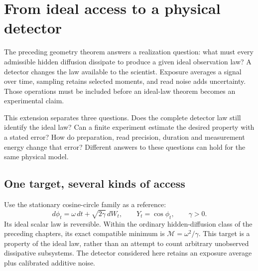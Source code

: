 \chapter{From ideal access to a physical detector}
\label{ch:dg-entry}

The preceding geometry theorem answers a realization question: what must
every admissible hidden diffusion dissipate to produce a given ideal
observation law? A detector changes the law available to the scientist.
Exposure averages a signal over time, sampling retains selected moments,
and read noise adds uncertainty. Those operations must be included before
an ideal-law theorem becomes an experimental claim.

This extension separates three questions. Does the complete detector law
still identify the ideal law? Can a finite experiment estimate the desired
property with a stated error? How do preparation, read precision, duration
and measurement energy change that error? Different answers to these
questions can hold for the same physical model.

\section{One target, several kinds of access}

Use the stationary cosine-circle family as a reference:
\[
 d\phi_t=\omega\,dt+\sqrt{2\gamma}\,dW_t,
 \qquad Y_t=\cos\phi_t,\qquad \gamma>0.
\]
Its ideal scalar law is reversible. Within the ordinary hidden-diffusion
class of the preceding chapters, its exact compatible minimum is
$\mathcal M=\omega^2/\gamma$. This target is a property of the ideal
law, rather than an attempt to count arbitrary unobserved dissipative
subsystems. The detector considered here retains an exposure average plus
calibrated additive noise.

